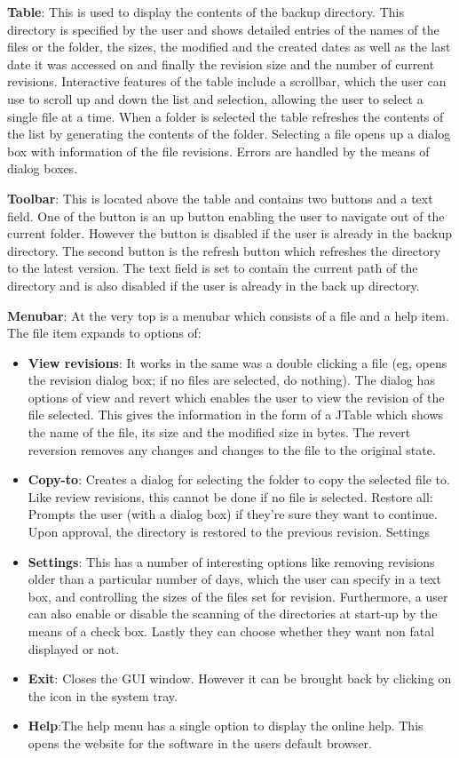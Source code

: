 \documentclass[12pt,a4paper]{article}
\begin{document}
\textbf{Table}: This is used to display the contents of the backup directory. This directory is specified by the user and shows detailed entries of the names of the files or the folder, the sizes, the modified and the created dates as well as the last date it was accessed on and finally the revision size and the number of current revisions. Interactive features of the table include a scrollbar, which the user can use to scroll up and down the list and selection, allowing the user to select a single file at a time. 
When a folder is selected the table refreshes the contents of the list by generating the contents of the folder. Selecting a file opens up a dialog box with information of the file revisions. Errors are handled by the means of dialog boxes. 

\textbf{Toolbar}: This is located above the table and contains two buttons and a text field. One of the button is an up button enabling the user to navigate out of the current folder. However the button is disabled if the user is already in the backup directory. The second button is the refresh button which refreshes the directory to the latest version. The text field is set to contain the current path of the directory and is also disabled if the user is already in the back up directory. 

\textbf{Menubar}: At the very top is a menubar which consists of a file and a help item. The file item expands to options of: 

\begin{itemize}
\item \textbf{View revisions}: It works in the same was a double clicking a file (eg, opens the revision dialog box; if no files are selected, do nothing). The dialog has options of view and revert which enables the user to view the revision of the file selected. This gives the information in the form of a JTable which shows the name of the file, its size and the modified size in bytes. The revert reversion removes any changes and changes to the file to the original state.
\item \textbf{Copy-to}: Creates a dialog for selecting the folder to copy the selected file to. Like review revisions, this cannot be done if no file is selected. 
Restore all: Prompts the user (with a dialog box) if they're sure they want to continue. Upon approval, the directory is restored to the previous revision. 
Settings\item \textbf{Settings}: This has a number of interesting options like removing revisions older than a particular number of days, which the user can specify in a text box, and controlling the sizes of the files set for revision.  Furthermore, a user can also enable or disable the scanning of the directories at start-up by the means of a check box. Lastly they can choose whether they want non fatal displayed or not.
\item \textbf{Exit}: Closes the GUI window. However it can be brought back by clicking on the icon in the system tray. 
\item \textbf{Help}:The help menu has a single option to display the online help. This opens the website for the software in the users default browser. 
\end{itemize}
\end{document}
